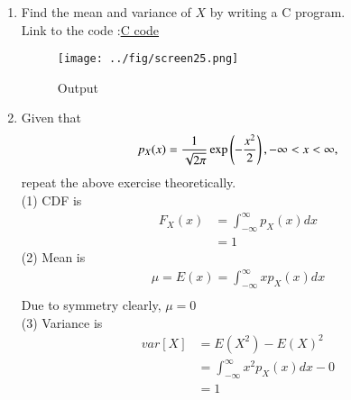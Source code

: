\documentclass[journal,12pt,twocolumn]{IEEEtran}
\renewcommand\thesection{\arabic{section}}
\begin{document}
\begin{enumerate}[label=\thesection.\arabic*
,ref=\thesection.\theenumi]
\begin{figure}[h]
\centering
\texttt{[image: ../Figures/gauss\_pdf]}
\caption{The PDF of $X$}
\label{fig:gauss_pdf}
\end{figure}

Properties :\\
(1) Area under the curve is One.\\
(2) Symmetric about line $x=\mu$.\\
(3) Increasing in first half and decreasing in other half.

\vspace{0.2in}

\item Find the mean and variance of $X$ by writing a C program.\\
\solution Link to the code :\href{https://github.com/anikettsatpute/Probability-and-Random-Variable-Assignment/blob/main/code/code2_4.c}{C code}
\begin{figure}[h]
\centering
\texttt{[image: ../fig/screen25.png]}
\caption{Output}
\label{fig:gauss_cdf}
\end{figure}

\item Given that
\begin{align}
p_{X}(x) = \frac{1}{\sqrt{2\pi}}\exp\left(-\frac{x^2}{2}\right), -\infty < x < \infty,
\end{align}
repeat the above exercise theoretically.
\solution \\
(1) CDF is 
\begin{align*}
F_X(x) &= \int_{-\infty}^{\infty}p_X(x)dx\\
&= 1
\end{align*}
(2) Mean is
\begin{align*}
\mu = E(x) = \int_{-\infty}^{\infty} x p_X(x)dx\\
\end{align*}
Due to symmetry clearly, $\mu = 0$\\

(3) Variance is
\begin{align*}
var[X] &= E(X^{2}) - E(X)^{2}\\
&= \int_{-\infty}^{\infty} x^{2} p_X(x)dx  - 0\\
&= 1
\end{align*}


\end{enumerate}
\end{document}
